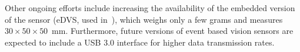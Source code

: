 Other ongoing efforts include increasing the availability of the embedded
version of the sensor (eDVS, used in~\cite{conradt09pencil}), which
weighs only a few grams and measures~$30\times50\times50$~mm. Furthermore,
future versions of event based vision sensors are expected to include
a USB 3.0 interface for higher data transmission rates.
